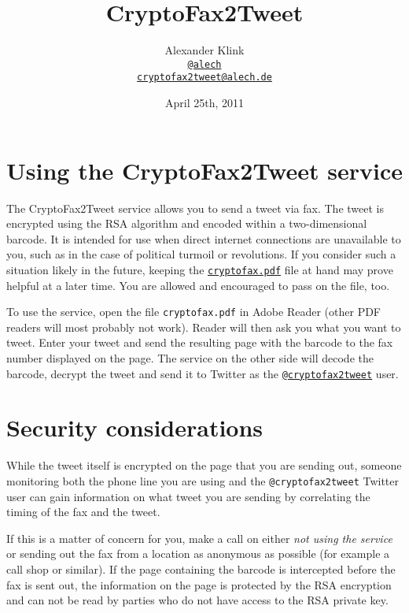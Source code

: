 \documentclass[DIV14,11pt]{scrartcl}
\begin{document}
\title{CryptoFax2Tweet}
\author{Alexander Klink\\\texttt{\href{https://twitter.com/alech}{@alech}}\\\texttt{\href{mailto:cryptofax2tweet@alech.de}{cryptofax2tweet@alech.de}}}
\date{April 25th, 2011}

\maketitle

\thispagestyle{empty}
\section*{Using the CryptoFax2Tweet service}

The CryptoFax2Tweet service allows you to send a tweet via fax.
The tweet is encrypted using the RSA algorithm and encoded within a two-dimensional
	barcode.
It is intended for use when direct internet connections are unavailable to you,
	such as in the case of political turmoil or revolutions.
If you consider such a situation likely in the future, keeping the
\texttt{\href{http://private.chaos-darmstadt.de/~revolution/cryptofax.pdf}{cryptofax.pdf}} file at hand may prove helpful at a later time.
You are allowed and encouraged to pass on the file, too.

To use the service, open the file \texttt{cryptofax.pdf} in Adobe Reader
	(other PDF readers will most probably not work).
Reader will then ask you what you want to tweet.
Enter your tweet and send the resulting page with the barcode to the fax number
	displayed on the page.
The service on the other side will decode the barcode, decrypt the tweet and
send it to Twitter as the \texttt{\href{https://twitter.com/cryptofax2tweet}{@cryptofax2tweet}} user.

\section*{Security considerations}

While the tweet itself is encrypted on the page that you are sending out,
	someone monitoring both the phone line you are using and the
	\texttt{@cryptofax2tweet} Twitter user can gain information on what tweet
	you are sending by correlating the timing of the fax and the tweet.

If this is a matter of concern for you, make a call on either
	\emph{not using the service} or sending out the fax from a location as
	anonymous as possible (for example a call shop or similar).
If the page containing the barcode is intercepted before the fax is sent out,
	the information on the page is protected by the RSA encryption and can not
	be read by parties who do not have access to the RSA private key.
\end{document}
